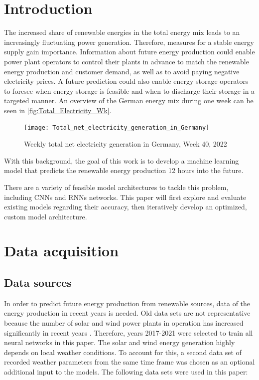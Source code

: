 \documentclass[11pt,table]{article}
\begin{document}
\newpage
\tableofcontents
\printacronyms
\newpage
{}



\section{Introduction}

The increased share of renewable energies in the total energy mix leads to an increasingly fluctuating power generation. Therefore, measures for a stable energy supply gain importance. Information about future energy production could enable power plant operators to control their plants in advance to match the renewable energy production and customer demand, as well as to avoid paying negative electricity prices. A future prediction could also enable energy storage operators to foresee when energy storage is feasible and when to discharge their storage in a targeted manner. An overview of the German energy mix during one week can be seen in \autoref{fig:Total_Electricity_Wk}.

\begin{figure}[ht]
	\centering
	\texttt{[image: Total\_net\_electricity\_generation\_in\_Germany]}
	\caption{Weekly total net electricity generation in Germany, Week 40, 2022 \cite{energy_charts_stromproduktion}}
	\label{fig:Total_Electricity_Wk}
\end{figure}

With this background, the goal of this work is to develop a machine learning model that predicts the renewable energy production 12 hours into the future.

There are a variety of feasible model architectures to tackle this problem, including \acp{CNN} and \acp{RNN} networks. This paper will first explore and evaluate existing models regarding their accuracy, then iteratively develop an optimized, custom model architecture.

\section{Data acquisition}
\subsection{Data sources}
In order to predict future energy production from renewable sources, data of the energy production in recent years is needed. Old data sets are not representative because the number of solar and wind power plants in operation has increased significantly in recent years \cite{statistaSolarPower, statistaWindPower}. Therefore, years 2017-2021 were selected to train all neural networks in this paper. The solar and wind energy generation highly depends on local weather conditions. To account for this, a second data set of recorded weather parameters from the same time frame was chosen as an optional additional input to the models.
The following data sets were used in this paper:
\end{document}
